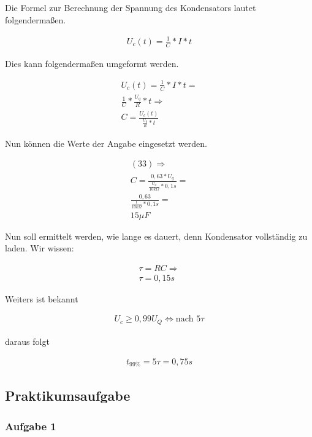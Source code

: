 Die Formel zur Berechnung der Spannung des Kondensators lautet folgendermaßen.

\begin{align}
    U_c(t) = \frac{1}{C} * I * t
\end{align}

Dies kann folgendermaßen umgeformt werden.

\begin{align}
    U_c(t) = \frac{1}{C} * I * t = \\
    \frac{1}{C} * \frac{U_q}{R} * t \Rightarrow \\
    C = \frac{U_c(t)}{\frac{U_q}{R} * t}
\end{align}

Nun können die Werte der Angabe eingesetzt werden.

\begin{align}
    (33) \Rightarrow \\
    C = \frac{0,63 * U_q}{\frac{U_q}{10k\Omega} * 0,1s} = \\
    \frac{0,63}{\frac{1}{10k\Omega} * 0,1s} = \\
    15\mu F
\end{align}

Nun soll ermittelt werden, wie lange es dauert, denn Kondensator vollständig zu laden.
Wir wissen:

\begin{align}
    \tau = RC \Rightarrow \\
    \tau = 0,15s
\end{align}

Weiters ist bekannt

\begin{align}
    U_c \geq 0,99U_Q \Leftrightarrow \text{nach } 5\tau
\end{align}

daraus folgt

\begin{align}
    t_{99\%} = 5\tau = 0,75s
\end{align}

\subsection{Praktikumsaufgabe}
\label{subsec:a4-praktikumsaufgabe2}

\subsubsection{Aufgabe 1}

